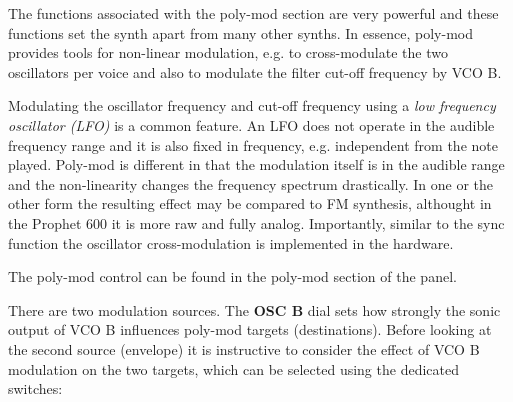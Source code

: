 The functions associated with the poly-mod section are very powerful and these functions set the synth apart from many other synths. In essence, poly-mod provides tools for non-linear modulation, e.g. to cross-modulate the two oscillators per voice and also to modulate the filter cut-off frequency by VCO B. 

Modulating the oscillator frequency and cut-off frequency using a \textit{low frequency oscillator (LFO)} is a common feature. An LFO does not operate in the audible frequency range and it is also fixed in frequency, e.g. independent from the note played. Poly-mod is different in that the modulation itself is in the audible range and the non-linearity changes the frequency spectrum drastically. In one or the other form the resulting effect may be compared to FM synthesis, althought in the Prophet 600 it is more raw and fully analog. Importantly, similar to the sync function the oscillator cross-modulation is implemented in the hardware.

The poly-mod control can be found in the poly-mod section of the panel. 

\begin{center}
\end{center}

There are two modulation sources. The \textbf{OSC B} dial sets how strongly the sonic output of VCO B influences poly-mod targets (destinations). Before looking at the second source (envelope) it is instructive to consider the effect of VCO B modulation on the two targets, which can be selected using the dedicated switches:

